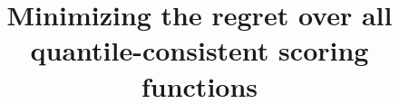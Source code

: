 \documentclass{article}
\begin{document}
\title{Minimizing the regret over all quantile-consistent scoring functions}
\date{}
\author{}
\maketitle

% 


% 
%
% 











\newpage
\appendix



%
\end{document}
